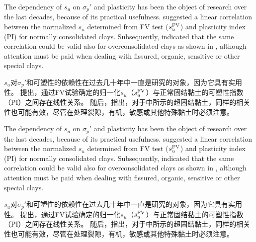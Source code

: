 \begin{ParaColumn}

    The dependency of $s_u$ on $\sigma_p'$ and plasticity has been the object of research over the last decades, because of its practical usefulness. \citet{Skempton195419} suggested a linear correlation between the normalized $s_u$ determined from FV test ($s_u^{\rm{FV}}$) and plasticity index (PI) for normally consolidated clays. Subsequently, \citet{Chandler198813} indicated that the same correlation could be valid also for overconsolidated clays as shown in , although attention must be paid when dealing with fissured, organic, sensitive or other special clays.

    \switchcolumn

    $s_u$对$\sigma_p'$和可塑性的依赖性在过去几十年中一直是研究的对象，因为它具有实用性。 \citet{Skempton195419}提出，通过FV试验确定的归一化$s_u$（$s_u^{\rm{FV}}$）与正常固结黏土的可塑性指数（PI）之间存在线性关系。 随后，\citet{Chandler198813}指出，对于中所示的超固结黏土，同样的相关性也可能有效，尽管在处理裂隙，有机，敏感或其他特殊黏土时必须注意。

    \switchcolumn*
    
    The dependency of $s_u$ on $\sigma_p'$ and plasticity has been the object of research over the last decades, because of its practical usefulness. \citet{Skempton195419} suggested a linear correlation between the normalized $s_u$ determined from FV test ($s_u^{\rm{FV}}$) and plasticity index (PI) for normally consolidated clays. Subsequently, \citet{Chandler198813} indicated that the same correlation could be valid also for overconsolidated clays as shown in , although attention must be paid when dealing with fissured, organic, sensitive or other special clays.

    \switchcolumn

    $s_u$对$\sigma_p'$和可塑性的依赖性在过去几十年中一直是研究的对象，因为它具有实用性。 \citet{Skempton195419}提出，通过FV试验确定的归一化$s_u$（$s_u^{\rm{FV}}$）与正常固结黏土的可塑性指数（PI）之间存在线性关系。 随后，\citet{Chandler198813}指出，对于中所示的超固结黏土，同样的相关性也可能有效，尽管在处理裂隙，有机，敏感或其他特殊黏土时必须注意。


\end{ParaColumn}
